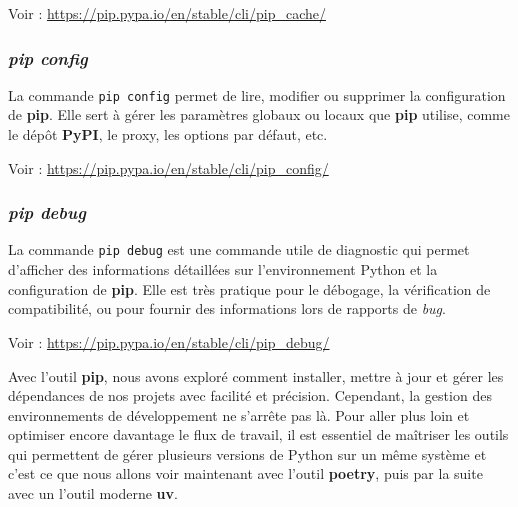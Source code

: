 Voir : \url{https://pip.pypa.io/en/stable/cli/pip_cache/}

\subsubsection*{\textit{pip config}}
La commande \texttt{pip config} permet de lire, modifier ou supprimer la configuration de \textbf{pip}. Elle sert à gérer les paramètres globaux ou locaux que \textbf{pip} utilise, comme le dépôt \textbf{PyPI}, le proxy, les options par défaut, etc.

Voir : \url{https://pip.pypa.io/en/stable/cli/pip_config/}

\subsubsection*{\textit{pip debug}}
La commande \texttt{pip debug} est une commande utile de diagnostic qui permet d’afficher des informations détaillées sur l’environnement Python et la configuration de \textbf{pip}. Elle est très pratique pour le débogage, la vérification de compatibilité, ou pour fournir des informations lors de rapports de \textit{bug}.

Voir : \url{https://pip.pypa.io/en/stable/cli/pip_debug/}

\bigskip 

\begin{center}
\end{center}

Avec l'outil \textbf{pip}, nous avons exploré comment installer, mettre à jour et gérer les dépendances de nos projets avec facilité et précision. Cependant, la gestion des environnements de développement ne s'arrête pas là. Pour aller plus loin et optimiser encore davantage le flux de travail, il est essentiel de maîtriser les outils qui permettent de gérer plusieurs versions de Python sur un même système et c'est ce que nous allons voir maintenant avec l'outil \textbf{poetry}, puis par la suite avec un l'outil moderne \textbf{uv}.
